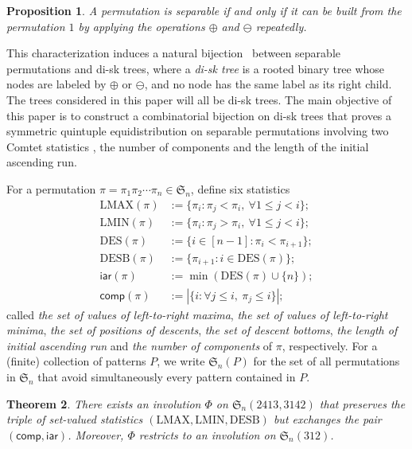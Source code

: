 \documentclass[12pt]{amsart}
\numberwithin{equation}{section}
\theoremstyle{plain}
\newtheorem{theorem}{Theorem}[section]
\newtheorem{proposition}[theorem]{Proposition}
\theoremstyle{definition}
\def\S{\mathfrak{S}}
\def\iar{\mathsf{iar}}
\def\comp{\mathsf{comp}}
\def\DES{\mathrm{DES}}
\def\LMAX{\mathrm{LMAX}}
\def\LMIN{\mathrm{LMIN}}
\def\LMIN{\mathrm{LMIN}}
\def\DESB{\mathrm{DESB}}
\def\DESB{\mathrm{DESB}}
\begin{document}
 \begin{proposition}\label{desides}
 A permutation is separable if and only if it can be built from the permutation $1$ by applying the operations $\oplus$ and $\ominus$ repeatedly. 
 \end{proposition}

This characterization induces a natural bijection~\cite{shapi} between separable permutations and di-sk trees, where a {\em di-sk tree} is a rooted binary tree whose nodes are labeled by $\oplus$ or $\ominus$, and no node has the same label as its right child. The trees considered in this paper will all be di-sk trees. The main objective of this paper is to construct a combinatorial bijection on di-sk trees that proves a symmetric quintuple equidistribution on separable permutations involving two Comtet statistics \cite{flw}, the number of components and the length of the initial ascending run.  

For a permutation $\pi=\pi_1\pi_2\cdots\pi_n\in\S_n$, define six statistics
\begin{align*}
\LMAX(\pi) &:=\{\pi_i:\pi_j<\pi_i,\: \forall 1\le j < i\};\\
\LMIN(\pi) &:=\{\pi_i:\pi_j>\pi_i,\: \forall 1\le j < i\};\\
\DES(\pi)&:=\{i\in[n-1]:\pi_i<\pi_{i+1}\};\\
\DESB(\pi)&:=\{\pi_{i+1}: i\in\DES(\pi)\};\\
\iar(\pi)&:=\min(\DES(\pi)\cup\{n\});\\
\comp(\pi)&:=|\{i: \forall j\leq i,\: \pi_j\leq i\}|;
\end{align*}
called {\em the set of values of  left-to-right maxima}, {\em the set of values of  left-to-right minima}, {\em the set of positions of descents}, {\em the set of descent bottoms}, {\em the length of initial ascending  run} and {\em the number of components} of $\pi$, respectively.  For  a (finite) collection of patterns $P$, we write $\S_n(P)$ for the set of all permutations in $\S_n$ that avoid simultaneously every pattern contained in $P$. 

\begin{theorem}\label{thm:sep:sym}
There exists an involution $\Phi$  on $\S_n(2413,3142)$ that preserves the triple of set-valued statistics $(\LMAX,\LMIN,\DESB)$ but exchanges the pair $(\comp,\iar)$. Moreover, $\Phi$ restricts to an involution on $\S_n(312)$.
\end{theorem}
\end{document}
